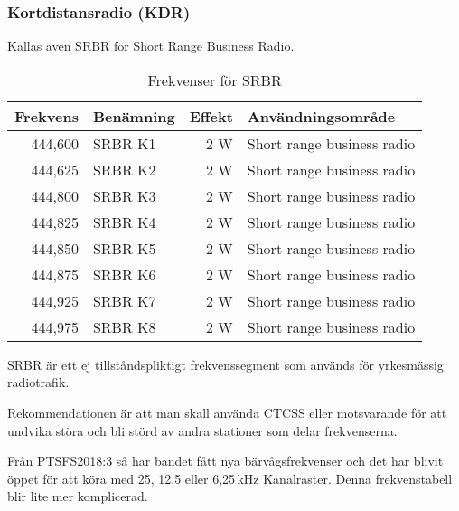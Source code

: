 \subsubsection{Kortdistansradio (KDR)}

Kallas även SRBR för Short Range Business Radio.

\begin{table}[h]
	\centering
\begin{tabular}{rlrl}
\textbf{Frekvens} & \textbf{Benämning} & \textbf{Effekt} & \textbf{Användningsområde} \\ \hline
444,600 & SRBR K1            & 2 W             & Short range business radio \\
444,625 & SRBR K2            & 2 W             & Short range business radio \\
444,800 & SRBR K3            & 2 W             & Short range business radio \\
444,825 & SRBR K4            & 2 W             & Short range business radio \\
444,850 & SRBR K5            & 2 W             & Short range business radio \\
444,875 & SRBR K6            & 2 W             & Short range business radio \\
444,925 & SRBR K7            & 2 W             & Short range business radio \\
444,975 & SRBR K8            & 2 W             & Short range business radio
\end{tabular}
\caption{Frekvenser för SRBR}
\end{table}	

SRBR är ett ej tillståndspliktigt frekvenssegment som används för yrkesmässig radiotrafik.

Rekommendationen är att man skall använda CTCSS eller motsvarande för att undvika störa och bli störd av andra stationer som delar frekvenserna.

Från PTSFS2018:3 så har bandet fått nya bärvågsfrekvenser och det har blivit öppet för att köra med 25, 12,5 eller 6,25\,kHz Kanalraster. Denna frekvenstabell blir lite mer komplicerad.

